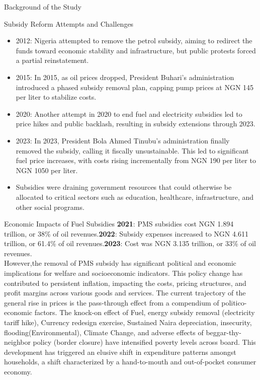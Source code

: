 \documentclass{beamer}
\begin{document}
{\begin{frame}{Background of the Study}
\end{frame}

\begin{frame}{Subsidy Reform Attempts and Challenges}
    \begin{itemize}
        \item 2012: Nigeria attempted to remove the petrol subsidy, aiming to redirect the funds toward economic stability and infrastructure, but public protests forced a partial reinstatement.
        \item 2015: In 2015, as oil prices dropped, President Buhari’s administration introduced a phased subsidy removal plan, capping pump prices at NGN 145 per liter to stabilize costs. 
        \item 2020: Another attempt in 2020 to end fuel and electricity subsidies led to price hikes and public backlash, resulting in subsidy extensions through 2023.
       \item 2023: In 2023, President Bola Ahmed Tinubu’s administration finally removed the subsidy, calling it fiscally unsustainable. This led to significant fuel price increases, with costs rising incrementally from NGN 190 per liter to NGN 1050 per liter.
       \item Subsidies were draining government resources that could otherwise be allocated to critical sectors such as education, healthcare, infrastructure, and other social programs.
    \end{itemize}
\end{frame}
\begin{frame}{Economic Impacts of Fuel Subsidies}
       \textbf{2021}: PMS subsidies cost NGN 1.894 trillion, or 38\% of oil revenues.\textbf{2022}: Subsidy expenses increased to NGN 4.611 trillion, or 61.4\% of oil revenues.\textbf{2023}: Cost was NGN 3.135 trillion, or 33\% of oil revenues. \\
 However,the removal of PMS subsidy has significant political and economic implications for welfare and socioeconomic indicators. This policy change has contributed to persistent inflation, impacting the costs, pricing structures, and profit margins across various goods and services. The current trajectory of the general rise in prices is the pass-through effect from a compendium of politico-economic factors. The knock-on effect of Fuel, energy subsidy removal (electricity tariff hike), Currency redesign exercise, Sustained Naira depreciation, insecurity, flooding(Environmental), Climate Change, and adverse effects of beggar-thy-neighbor policy (border closure) have intensified poverty levels across board. This development has triggered an elusive shift in expenditure patterns amongst households, a shift characterized by a hand-to-mouth and out-of-pocket consumer economy.
\end{frame}
}
\end{document}
